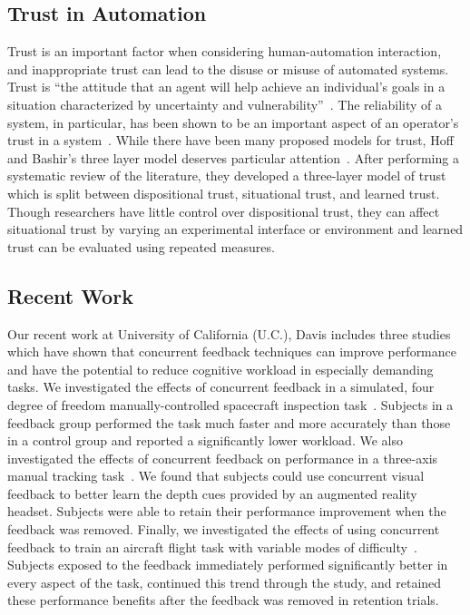 \subsection{Trust in Automation}
Trust is an important factor when considering human-automation interaction, and inappropriate trust can lead to the disuse or misuse of automated systems.
Trust is ``the attitude that an agent will help achieve an individual's goals in a situation characterized by uncertainty and vulnerability''~\cite{lee_trust_2004}.
The reliability of a system, in particular, has been shown to be an important aspect of an operator's trust in a system~\cite{RN38}.
While there have been many proposed models for trust, Hoff and Bashir's three layer model deserves particular attention~\cite{RN39}.
After performing a systematic review of the literature, they developed a three-layer model of trust which is split between dispositional trust, situational trust, and learned trust.
Though researchers have little control over dispositional trust, they can affect situational trust by varying an experimental interface or environment and learned trust can be evaluated using repeated measures.

\subsection{Recent Work}
Our recent work at University of California (U.C.), Davis includes three studies which have shown that concurrent feedback techniques can improve performance and have the potential to reduce cognitive workload in especially demanding tasks.
We investigated the effects of concurrent feedback in a simulated, four degree of freedom manually-controlled spacecraft inspection task~\cite{karasinski_real-time_2017}.
Subjects in a feedback group performed the task much faster and more accurately than those in a control group and reported a significantly lower workload.
We also investigated the effects of concurrent feedback on performance in a three-axis manual tracking task~\cite{karasinski_evaluating_2019}.
We found that subjects could use concurrent visual feedback to better learn the depth cues provided by an augmented reality headset.
Subjects were able to retain their performance improvement when the feedback was removed.
Finally, we investigated the effects of using concurrent feedback to train an aircraft flight task with variable modes of difficulty~\cite{RN42}.
Subjects exposed to the feedback immediately performed significantly better in every aspect of the task, continued this trend through the study, and retained these performance benefits after the feedback was removed in retention trials.

